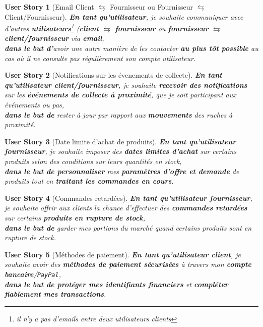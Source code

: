\documentclass[a4paper,12pt]{book}
\theoremstyle{break}
\newtheorem*{userStory}{User Story}
\theoremstyle{break}
\theoremstyle{break}
\theoremstyle{break}
\theoremstyle{definition}
\theoremstyle{remark}
\begin{document}
\begin{userStory}[Email Client $\leftrightarrows$ Fournisseur ou Fournisseur $\leftrightarrows$ Client/Fournisseur]
\textbf{En tant qu'utilisateur}, je souhaite communiquer avec d'autres \textbf{utilisateurs}\footnote{il n'y a pas d'emails entre deux utilisateurs {\color{green}clients}} (\textbf{{\color{green}client}} $\leftrightarrows$ \textbf{{\color{red}fournisseur}} ou \textbf{{\color{red}fournisseur}} $\leftrightarrows$ \textbf{{\color{green}client}/{\color{red}fournisseur}} via \textbf{email},\\
\indent
\textbf{dans le but d'}avoir une autre manière de les contacter \textbf{au plus tôt possible} au cas où il ne consulte pas régulièrement son compte utilisateur.
\end{userStory}

\begin{userStory}[Notifications sur les évenements de collecte]
\textbf{En tant qu'utilisateur {\color{green}client}/{\color{red}fournisseur}}, je souhaite \textbf{recevoir des notifications} sur les \textbf{événements de collecte à proximité}, que je soit participant aux événements ou pas,\\
\indent
\textbf{dans le but de} rester à jour par rapport aux \textbf{mouvements} des ruches à proximité.
\end{userStory}

\begin{userStory}[Date limite d'achat de produits]
\textbf{En tant qu'utilisateur {\color{red}fournisseur}}, je souhaite imposer des \textbf{dates limites d'achat} sur certains produits selon des conditions sur leurs quantités en stock,\\
\indent
\textbf{dans le but de personnaliser} mes \textbf{paramètres d'offre et demande} de produits tout en \textbf{traitant les commandes en cours}.
\end{userStory}

\begin{userStory}[Commandes retardées]
\textbf{En tant qu'utilisateur {\color{red}fournisseur}}, je souhaite offrir aux clients la chance d'effectuer des \textbf{commandes retardées} sur certains \textbf{produits en rupture de stock},\\
\indent
\textbf{dans le but de} garder mes portions du marché quand certains produits sont en rupture de stock.
\end{userStory}

\begin{userStory}[Méthodes de paiement]
\textbf{En tant qu'utilisateur {\color{green}client}}, je souhaite avoir des \textbf{méthodes de paiement sécurisées} à travers mon \textbf{compte bancaire}/\texttt{PayPal},\\
\indent
\textbf{dans le but de protéger mes identifiants financiers} et \textbf{compléter fiablement mes transactions}.
\end{userStory}
\end{document}
